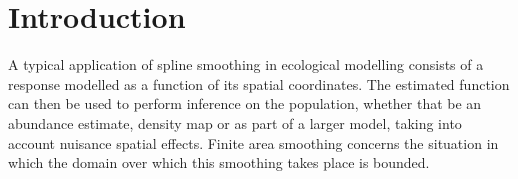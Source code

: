 \documentclass[useAMS,referee, usegraphicx]{biom}
\begin{document}

\maketitle



%
\section{Introduction \label{IN}}

A typical application of spline smoothing in ecological modelling consists of a response modelled as a function of its spatial coordinates. The estimated function can then be used to perform inference on the population, whether that be an abundance estimate, density map or as part of a larger model, taking into account nuisance spatial effects. Finite area smoothing concerns the situation in which the domain over which this smoothing takes place is bounded. 
\end{document}
